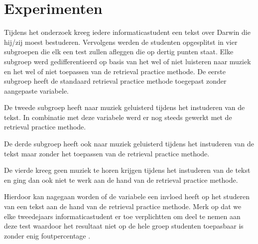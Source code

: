 \documentclass{hogent-article}
\begin{document}
	
	\section{Experimenten} %
	Tijdens het onderzoek kreeg iedere informaticastudent een tekst over Darwin die hij/zij moest bestuderen. Vervolgens werden de studenten opgesplitst in vier subgroepen die elk een test zullen afleggen die op dertig punten staat. Elke subgroep werd gedifferentieerd op basis van het wel of niet luisteren naar muziek en het wel of niet toepassen van de retrieval practice methode.
	De eerste subgroep heeft de standaard retrieval practice methode toegepast zonder aangepaste variabele. 

	De tweede subgroep heeft naar muziek geluisterd tijdens het instuderen van de tekst. In combinatie met deze variabele werd er nog steeds gewerkt met de retrieval practice methode.
	
	De derde subgroep heeft ook naar muziek geluisterd tijdens het instuderen van de tekst maar zonder het toepassen van de retrieval practice methode.
	
	De vierde kreeg geen muziek te horen krijgen tijdens het instuderen van de tekst en ging dan ook niet te werk aan de hand van de retrieval practice methode.
	
	Hierdoor kan nagegaan worden of de variabele een invloed heeft op het studeren van een tekst aan de hand van de retrieval practice methode. Merk op dat we elke tweedejaars informaticastudent er toe verplichtten om deel te nemen aan deze test waardoor het resultaat niet op de hele groep studenten toepasbaar is zonder enig foutpercentage \autocite{karpicke2009metacognitive}.
	
\end{document}
